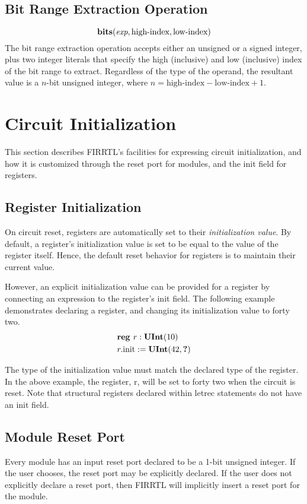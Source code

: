 \documentclass[12pt]{article}
\begin{document}
\subsection{Bit Range Extraction Operation}
\[
\text{\bf bits}(\text{\em exp}, \text{high-index}, \text{low-index})
\]
The bit range extraction operation accepts either an unsigned or a signed integer, plus two integer literals that specify the high (inclusive) and low (inclusive) index of the bit range to extract. Regardless of the type of the operand, the resultant value is a $n$-bit unsigned integer, where $n = \text{high-index} - \text{low-index} + 1$. 

\section{Circuit Initialization} \label{initialization}

This section describes FIRRTL's facilities for expressing circuit initialization, and how it is customized through the reset port for modules, and the init field for registers. 

\subsection{Register Initialization}
On circuit reset, registers are automatically set to their {\em initialization value}. By default, a register's initialization value is set to be equal to the value of the register itself. Hence, the default reset behavior for registers is to maintain their current value.

However, an explicit initialization value can be provided for a register by connecting an expression to the register's init field. The following example demonstrates declaring a register, and changing its initialization value to forty two.
\[
\begin{aligned}
& \text{\bf reg\ } r : \text{\bf UInt}(10) \\
& r.\text{init} := \text{\bf UInt}(42, \text{\bf ?})
\end{aligned}
\]

The type of the initialization value must match the declared type of the register. In the above example, the register, r, will be set to forty two when the circuit is reset. Note that structural registers declared within letrec statements do not have an init field.

\subsection{Module Reset Port}
Every module has an input reset port declared to be a 1-bit unsigned integer. If the user chooses, the reset port may be explicitly declared. If the user does not explicitly declare a reset port, then FIRRTL will implicitly insert a reset port for the module. 
\end{document}
